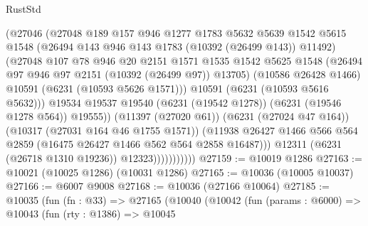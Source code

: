 \begin{lexlean}{RustStd}
\begin{coremodule}
{{                              (@27046
                                (@27048
                                  @189
                                  @157
                                  @946
                                  @1277
                                  @1783
                                  @5632
                                  @5639
                                  @1542
                                  @5615
                                  @1548
                                  (@26494 @143 @946 @143 @1783 (@10392 (@26499 @143)) @11492)
                                  (@27048
                                    @107
                                    @78
                                    @946
                                    @20
                                    @2151
                                    @1571
                                    @1535
                                    @1542
                                    @5625
                                    @1548
                                    (@26494 @97 @946 @97 @2151 (@10392 (@26499 @97)) @13705)
                                    (@10586 @26428 @1466)
                                    @10591
                                    (@6231 (@10593 @5626 @1571)))
                                  @10591
                                  (@6231 (@10593 @5616 @5632)))
                                @19534
                                @19537
                                @19540
                                (@6231 (@19542 @1278))
                                (@6231 (@19546 @1278 @564))
                                @19555))
                            (@11397 (@27020 @61))
                            (@6231 (@27024 @47 @164))
                            (@10317 (@27031 @164 @46 @1755 @1571))
                            (@11938
                              @26427
                              @1466
                              @566
                              @564
                              @2859
                              (@16475 @26427 @1466 @562 @564 @2858 @16487)))
                          @12311
                          (@6231 (@26718 @1310 @19236))
                          @12323)))))))))))
@27159 := @10019 @1286
@27163 := @10021 (@10025 @1286) (@10031 @1286)
@27165 := @10036 (@10005 @10037)
@27166 := @6007 @9008
@27168 := @10036 (@27166 @10064)
@27185 := @10035
    (fun (fn : @33) =>
    @27165
      (@10040
        (@10042
          (fun (params : @6000) =>
          @10043
            (fun (rty : @1386) =>
            @10045
}}
\end{coremodule}
\end{lexlean}
